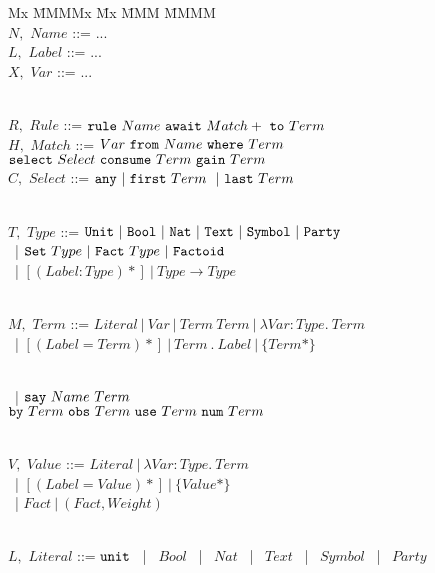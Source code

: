 \begin{figure}
\begin{tabbing}
Mx \= MMMMx \= Mx \= MMM \= MMMM \kill
\\ $N,$ \> $Name$       \> ::= \> ...
\\ $L,$ \> $Label$      \> ::= \> ...
\\ $X,$ \> $Var$        \> ::= \> ...

\\[1ex]
  $R,$ \> $Rule$       \> ::= \> $\texttt{rule}~ Name~ \texttt{await}~ Match+~ \texttt{to}~ Term$
\\[0.5ex]
  $H,$ \> $Match$      \> ::= \> $Var~ \texttt{from}~ Name~ \texttt{where}~ Term$
\\      \>              \>     \> \hspace{1.6em} $\texttt{select}~ Select~ \texttt{consume}~ Term~ \texttt{gain}~ Term$
\\[0.5ex]
  $C,$ \> $Select$     \> ::= \> $\texttt{any}~ |~ \texttt{first}~ Term~ ~|~ \texttt{last}~ Term$

\\[1ex]
   $T,$ \> $Type$       \> ::= \> $\texttt{Unit}~ |~ \texttt{Bool}~ |~ \texttt{Nat}~ |~ \texttt{Text}~ |~ \texttt{Symbol}~ |~ \texttt{Party}$
\\ \>                   \> ~|  \> $\texttt{Set}~ Type~ |~ \texttt{Fact}~ Type~ |~ \texttt{Factoid}$
\\ \>                   \> ~|  \> $[ (Label : Type)* ] ~|~ Type \to Type~$

\\[1ex]
  $M,$   \> $Term$      \> ::= \> $Literal~ |~ Var~ |~ Term~ Term~ |~ \lambda Var : Type.~ Term$
\\ \>                   \> ~|  \> $[ (Label = Term)* ]~ |~ Term~ .~ Label ~|~ \{ Term* \}$

\\[0.5ex] \>            \> ~|  \> $\texttt{say}~ Name~ Term~$
\\        \>            \>     \> \hspace{0.5em} $\texttt{by}~ Term~ \texttt{obs}~ Term~ \texttt{use}~ Term~ \texttt{num}~ Term$

\\[1ex]
  $V,$   \> $Value$     \> ::= \> $Literal~ |~ \lambda Var : Type.~ Term$
\\       \>             \> ~|  \> $[ (Label = Value)* ] ~|~ \{ Value* \}$
\\       \>             \> ~|  \> $Fact ~|~ (Fact, Weight)$

\\[1ex]
  $L,$   \> $Literal$   \> ::= \> $\texttt{unit}$ ~|~ $Bool$ ~|~ $Nat$ ~|~ $Text$ ~|~ $Symbol$ ~|~ $Party$
\end{tabbing}


\end{figure}
